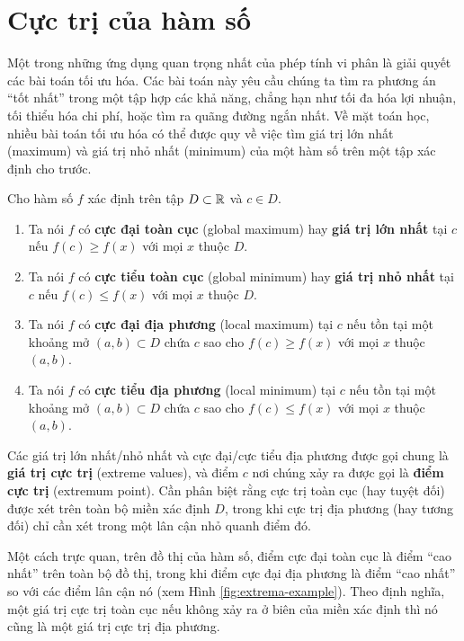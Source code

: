 \section{Cực trị của hàm số}
\label{sec:extrema-of-functions}

Một trong những ứng dụng quan trọng nhất của phép tính vi phân là giải quyết các bài toán tối ưu hóa. Các bài toán này yêu cầu chúng ta tìm ra phương án ``tốt nhất'' trong một tập hợp các khả năng, chẳng hạn như tối đa hóa lợi nhuận, tối thiểu hóa chi phí, hoặc tìm ra quãng đường ngắn nhất. Về mặt toán học, nhiều bài toán tối ưu hóa có thể được quy về việc tìm giá trị lớn nhất (maximum) và giá trị nhỏ nhất (minimum) của một hàm số trên một tập xác định cho trước.

\begin{definition}\label{def:extrema}
Cho hàm số $f$ xác định trên tập $D \subset \mathbb{R}$ và $c \in D$.
\begin{enumerate}[label=(\alph*)]
    \item Ta nói $f$ có \textbf{cực đại toàn cục} (global maximum) hay \textbf{giá trị lớn nhất} tại $c$ nếu $f(c) \ge f(x)$ với mọi $x$ thuộc $D$.
    \item Ta nói $f$ có \textbf{cực tiểu toàn cục} (global minimum) hay \textbf{giá trị nhỏ nhất} tại $c$ nếu $f(c) \le f(x)$ với mọi $x$ thuộc $D$.
    \item Ta nói $f$ có \textbf{cực đại địa phương} (local maximum) tại $c$ nếu tồn tại một khoảng mở $(a,b) \subset D$ chứa $c$ sao cho $f(c) \ge f(x)$ với mọi $x$ thuộc $(a,b)$.
    \item Ta nói $f$ có \textbf{cực tiểu địa phương} (local minimum) tại $c$ nếu tồn tại một khoảng mở $(a,b) \subset D$ chứa $c$ sao cho $f(c) \le f(x)$ với mọi $x$ thuộc $(a,b)$.
\end{enumerate}
\end{definition}

Các giá trị lớn nhất/nhỏ nhất và cực đại/cực tiểu địa phương được gọi chung là \textbf{giá trị cực trị} (extreme values), và điểm $c$ nơi chúng xảy ra được gọi là \textbf{điểm cực trị} (extremum point). Cần phân biệt rằng cực trị toàn cục (hay tuyệt đối) được xét trên toàn bộ miền xác định $D$, trong khi cực trị địa phương (hay tương đối) chỉ cần xét trong một lân cận nhỏ quanh điểm đó.

Một cách trực quan, trên đồ thị của hàm số, điểm cực đại toàn cục là điểm ``cao nhất'' trên toàn bộ đồ thị, trong khi điểm cực đại địa phương là điểm ``cao nhất'' so với các điểm lân cận nó (xem Hình \ref{fig:extrema-example}). Theo định nghĩa, một giá trị cực trị toàn cục nếu không xảy ra ở biên của miền xác định thì nó cũng là một giá trị cực trị địa phương.

